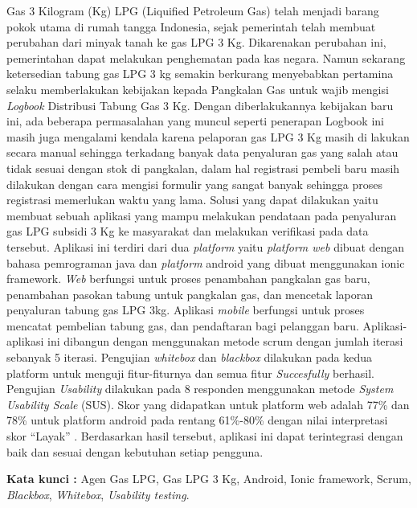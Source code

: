 \begin{abstractind}
Gas 3 Kilogram (Kg) LPG  (Liquified Petroleum Gas) telah menjadi barang pokok utama di rumah tangga Indonesia, sejak pemerintah telah membuat perubahan dari minyak tanah ke gas LPG 3 Kg. Dikarenakan perubahan ini, pemerintahan dapat melakukan penghematan pada kas negara. Namun sekarang ketersedian tabung gas LPG 3 kg semakin berkurang menyebabkan pertamina selaku memberlakukan kebijakan kepada Pangkalan Gas untuk wajib mengisi \textit{Logbook} Distribusi Tabung Gas 3 Kg. Dengan diberlakukannya kebijakan baru ini, ada beberapa permasalahan yang muncul seperti penerapan Logbook ini masih juga mengalami kendala karena pelaporan gas LPG 3 Kg masih di lakukan secara manual sehingga terkadang banyak data penyaluran gas yang salah atau tidak sesuai dengan stok di pangkalan, dalam hal registrasi pembeli baru masih dilakukan dengan cara mengisi formulir yang sangat banyak sehingga proses registrasi memerlukan waktu yang lama. Solusi yang dapat dilakukan yaitu membuat sebuah aplikasi yang mampu melakukan pendataan pada penyaluran gas LPG subsidi 3 Kg ke masyarakat dan melakukan verifikasi pada data tersebut. Aplikasi ini terdiri dari dua \textit{platform} yaitu \textit{platform web} dibuat dengan bahasa pemrograman java dan \textit{platform} android yang dibuat menggunakan ionic framework. \textit{Web} berfungsi untuk proses penambahan pangkalan gas baru,  penambahan pasokan tabung untuk pangkalan gas, dan mencetak laporan penyaluran tabung gas LPG 3kg. Aplikasi \textit{mobile} berfungsi untuk proses mencatat pembelian tabung gas, dan pendaftaran bagi pelanggan baru. Aplikasi-aplikasi ini dibangun dengan menggunakan metode scrum dengan jumlah iterasi sebanyak 5 iterasi. Pengujian \textit{whitebox} dan \textit{blackbox} dilakukan pada kedua platform untuk menguji fitur-fiturnya dan semua fitur \textit{Succesfully} berhasil. Pengujian \textit{Usability} dilakukan pada 8 responden menggunakan metode \textit{System Usability Scale} (SUS). Skor yang didapatkan untuk platform web adalah 77\% dan 78\% untuk platform android pada rentang 61\%-80\% dengan nilai interpretasi skor “Layak” . Berdasarkan hasil tersebut, aplikasi ini dapat terintegrasi dengan baik dan sesuai dengan kebutuhan setiap pengguna.


\bigskip
\noindent
\textbf{Kata kunci :} Agen Gas LPG, Gas LPG 3 Kg, Android, Ionic framework, Scrum, \textit{Blackbox}, \textit{Whitebox}, \textit{Usability testing}.
\end{abstractind}
